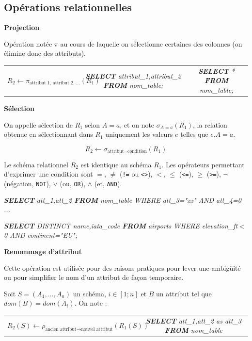 \documentclass[10pt,fleqn]{article} %
\begin{document}
\subsection*{Opérations relationnelles}

\begin{defi}
\textbf{Projection}

Opération notée $\pi$ au cours de laquelle on sélectionne certaines des colonnes (on élimine donc des attributs). 
\begin{tabular}{ccc}
$
 R_2 \leftarrow \pi_{\text{attribut 1, attribut 2, ...}}(R_1)
$
& 
\textsl{\textbf{SELECT} attribut\_1,attribut\_2 \textbf{FROM} nom\_table;}
&
\textsl{\textbf{SELECT} * \textbf{FROM} nom\_table;}
\end{tabular}
\end{defi}




\begin{defi}
\textbf{Sélection}

On appelle sélection de $R_1$ selon $A=a$, et on note $\sigma_{A=a}(R_1)$, la relation obtenue en sélectionnant dans $R_1$ uniquement les valeurs $e$ telles que $e.A = a$.


$$
R_2 \leftarrow \sigma_{\text{attribut}=\text{condition}}(R_1)
$$


Le schéma relationnel $R_2$ est identique au schéma $R_1$.  Les opérateurs permettant d'exprimer une condition sont $=$, $\neq$ (\texttt{!=} ou \texttt{<>}), $<$, $\leq$ (\texttt{<=}), $\geq$ (\texttt{>=}), $\neg$ (négation, \texttt{NOT}), $\vee$ (ou, \texttt{OR}), $\wedge$ (et, \texttt{AND}).


\textsl{\textbf{SELECT} att\_1,att\_2 \textbf{FROM} nom\_table WHERE att\_3="xx" AND att\_4=0 ...}

\textsl{\textbf{SELECT} DISTINCT name,iata\_code \textbf{FROM} airports WHERE elevation\_ft$<$0 AND continent="EU";}
\end{defi}





\begin{defi}
\textbf{Renommage d'attribut}

Cette opération est utilisée pour des raisons pratiques pour lever une ambigüité ou pour simplifier le nom d'un attribut de façon temporaire. 

Soit $S = (A_1,... ,A_n)$ un schéma, $ i \in[1;n]$ et $B$ un attribut tel que
$dom(B) = dom(A_i)$. On note :

\begin{center}
\begin{tabular}{cc}
$R_2 (S)\leftarrow \rho_{\text{ancien attribut} \rightarrow \text{nouvel attribut}}(R_1(S))$ & 
\textsl{\textbf{SELECT} att\_1,att\_2 as att\_3 \textbf{FROM} nom\_table}\\
\end{tabular}
\end{center}

\end{defi}
\end{document}

